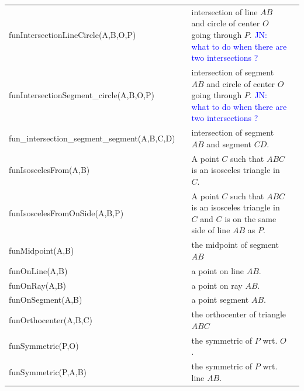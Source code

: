 \documentclass[a4wide,9pt,landscape]{article}
\newcommand{\jn}[1]{\textcolor{blue}{JN: #1}}
\begin{document}
\begin{tabularx}{270mm}{>{\ttfamily}llXX}
funIntersectionLineCircle(A,B,O,P) & 
&
intersection of line $AB$ and circle of center $O$ going through $P$. \jn{what to do when there are two intersections ?} \\
funIntersectionSegment\_circle(A,B,O,P) & 
&
intersection of segment $AB$ and circle of center $O$ going through $P$. \jn{what to do when there are two intersections ?} \\
fun\_intersection\_segment\_segment(A,B,C,D) & 
&
intersection of segment $AB$ and segment $CD$. \\
funIsoscelesFrom(A,B) & 
&
A point $C$ such that $ABC$ is an isosceles triangle in $C$. \\
funIsoscelesFromOnSide(A,B,P) & 
&
A point $C$ such that $ABC$ is an isosceles triangle in $C$ and $C$ 
is on the same side of line $AB$ as $P$. \\
funMidpoint(A,B) & 
&
the midpoint of segment $AB$ \\
funOnLine(A,B) & &
a point on line $AB$. \\
funOnRay(A,B) & &
a point on ray $AB$. \\
funOnSegment(A,B) & &
a point segment $AB$. \\
funOrthocenter(A,B,C) & 
&
the orthocenter of triangle $ABC$ \\
funSymmetric(P,O) & 
&
the symmetric of $P$ wrt. $O$. \\
funSymmetric(P,A,B) & 
&
the symmetric of $P$ wrt. line $AB$. \\
\bottomrule
\end{tabularx}
\end{document}

